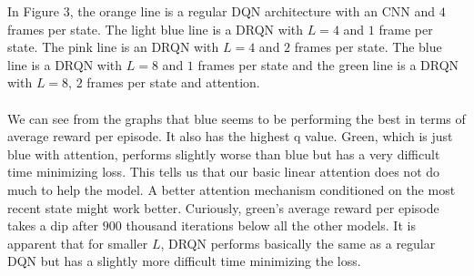 \documentclass{article}
\begin{document}
In Figure 3, the orange line is a regular DQN architecture with an CNN and $4$
frames per state. The light blue line is a DRQN with $L=4$ and $1$ frame per state.
The pink line is an DRQN with $L=4$ and $2$ frames per state. The blue line is a
DRQN with $L=8$ and $1$ frames per state and the green line is a DRQN with $L=8$,
$2$ frames per state and attention. \\
\\
We can see from the graphs that blue seems to be performing the best in terms of
average reward per episode. It also has the highest q value. Green, which is just
blue with attention, performs slightly worse than blue but has a very difficult
time minimizing loss. This tells us that our basic linear attention does not do
much to help the model. A better attention mechanism conditioned on the most recent
state might work better. Curiously, green's average reward per episode takes a
dip after $900$ thousand iterations below all the other models. It is apparent
that for smaller $L$, DRQN performs basically the same as a regular DQN but has a
slightly more difficult time minimizing the loss. \\
\end{document}
